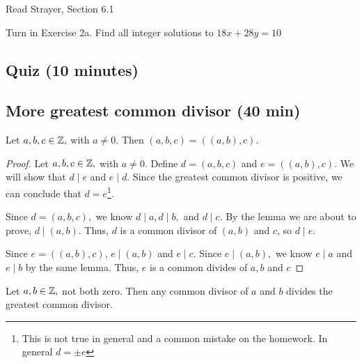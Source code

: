 \documentclass{ximera}
\begin{document}
\begin{pre}
 \item[Read] Strayer, Section 6.1
 \item[Turn in] Exercise 2a.
 Find all integer solutions to $18x+28y=10$
\end{pre}


\subsection{Quiz (10 minutes)}
\subsection{More greatest common divisor (40 min)} 

\begin{lem}\label{gcd_3case}
	Let $a,b,c\in\mathbb Z,$ with $a\neq 0$. Then $(a,b,c)=((a,b),c).$
\end{lem}

 \begin{proof}
 	Let $a,b,c\in\mathbb Z,$ with $a\neq 0$. Define $d=(a,b,c)$ and $e=((a,b),c).$ We will show that $d\mid e$ and $e\mid d$. Since the greatest common divisor is positive, we can conclude that $d=e$\footnote{This is not true in general and a common mistake on the homework. In general $d=\pm e$}.

 	Since $d=(a,b,c),$ we know $d\mid a, d\mid b,$ and $d\mid c$. By the lemma we are about to prove, $d\mid (a,b)$. Thus, $d$ is a common divisor of $(a,b)$ and $c$, so $d\mid e$.

 	Since $e=((a,b),c)$, $e\mid  (a,b)$ and $e\mid c$. Since $e\mid (a,b),$ we know $e\mid a$ and $e\mid b$ by the same lemma. Thus, $e$ is a common divides of $a,b$ and $c$
 \end{proof}

\begin{lem}\label{gcd_mult}
	Let $a,b\in\mathbb Z,$ not both zero. Then any  common divisor of $a$ and $b$ divides the greatest common divisor.
\end{lem}
\end{document}
